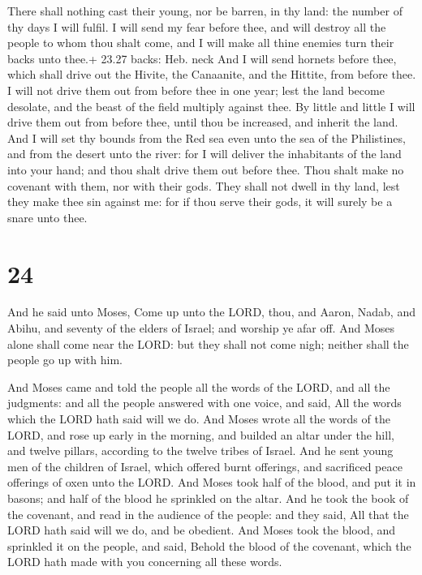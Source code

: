 There shall nothing cast their young, nor be barren, in
thy land: the number of thy days I will fulfil.  I will
send my fear before thee, and will destroy all the people to whom thou
shalt come, and I will make all thine enemies turn their backs unto
thee.+ 23.27 backs: Heb. neck  And I will send hornets
before thee, which shall drive out the Hivite, the Canaanite, and the
Hittite, from before thee.  I will not drive them out from
before thee in one year; lest the land become desolate, and the beast of
the field multiply against thee.  By little and little I
will drive them out from before thee, until thou be increased, and
inherit the land.  And I will set thy bounds from the Red
sea even unto the sea of the Philistines, and from the desert unto the
river: for I will deliver the inhabitants of the land into your hand;
and thou shalt drive them out before thee.  Thou shalt make
no covenant with them, nor with their gods.  They shall not
dwell in thy land, lest they make thee sin against me: for if thou serve
their gods, it will surely be a snare unto thee.

\hypertarget{section-23}{%
\section{24}\label{section-23}}

 And he said unto Moses, Come up unto the LORD, thou, and
Aaron, Nadab, and Abihu, and seventy of the elders of Israel; and
worship ye afar off.  And Moses alone shall come near the
LORD: but they shall not come nigh; neither shall the people go up with
him.

 And Moses came and told the people all the words of the
LORD, and all the judgments: and all the people answered with one voice,
and said, All the words which the LORD hath said will we do.
 And Moses wrote all the words of the LORD, and rose up
early in the morning, and builded an altar under the hill, and twelve
pillars, according to the twelve tribes of Israel.  And he
sent young men of the children of Israel, which offered burnt offerings,
and sacrificed peace offerings of oxen unto the LORD.  And
Moses took half of the blood, and put it in basons; and half of the
blood he sprinkled on the altar.  And he took the book of
the covenant, and read in the audience of the people: and they said, All
that the LORD hath said will we do, and be obedient.  And
Moses took the blood, and sprinkled it on the people, and said, Behold
the blood of the covenant, which the LORD hath made with you concerning
all these words.

